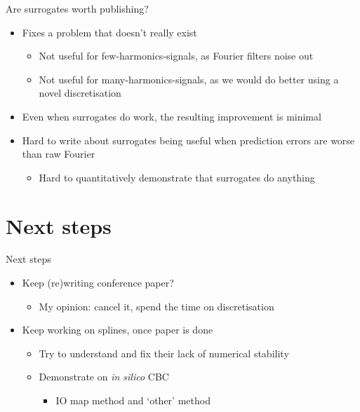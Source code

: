 \documentclass[presentation]{beamer}
\begin{document}
\begin{frame}[label={sec:org3cfff39}]{Are surrogates worth publishing?}
\begin{itemize}
\item Fixes a problem that doesn't really exist
\begin{itemize}
\item Not useful for few-harmonics-signals, as Fourier filters noise out
\item Not useful for many-harmonics-signals, as we would do better using a novel discretisation
\end{itemize}
\end{itemize}
\vfill
\begin{itemize}
\item Even when surrogates do work, the resulting improvement is minimal
\end{itemize}
\vfill
\begin{itemize}
\item Hard to write about surrogates being useful when prediction errors are worse than raw Fourier
\begin{itemize}
\item Hard to quantitatively demonstrate that surrogates do anything
\end{itemize}
\end{itemize}
\end{frame}

\section{Next steps}
\label{sec:orgef3ff29}
\begin{frame}[label={sec:org3413f9f}]{Next steps}
\begin{itemize}
\item Keep (re)writing conference paper?
\begin{itemize}
\item My opinion: cancel it, spend the time on discretisation
\end{itemize}
\end{itemize}
\vfill
\begin{itemize}
\item Keep working on splines, once paper is done
\begin{itemize}
\item Try to understand and fix their lack of numerical stability
\item Demonstrate on \emph{in silico} CBC
\begin{itemize}
\item IO map method and `other' method
\end{itemize}
\end{itemize}
\end{itemize}
\end{frame}
\end{document}
